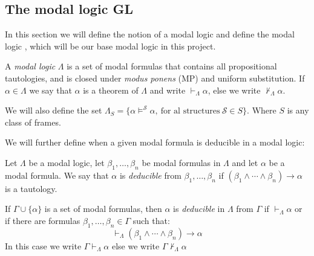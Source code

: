 \documentclass[../main.tex]{subfiles}
\begin{document}
\subsection{The modal logic GL}
In this section we will define the notion of a modal logic and define the modal
logic \GL, which will be our base modal logic in this project.
\begin{defi}
	A \textit{modal logic} $\Lambda$ is a set of modal formulas that contains all
	propositional tautologies, and is closed under \textit{modus ponens}
	(MP) and uniform substitution. If $\alpha\in\Lambda$ we say that
	$\alpha$ is a theorem of $\Lambda$ and write $\vdash_\Lambda\alpha$,
	else we write $\not\vdash_\Lambda\alpha$.

	We will also define the set
	$\Lambda_S=\{\alpha\vDash^\mathcal{S}\alpha,\ \text{for al structures}\
	\mathcal{S}\in S\}$. Where $S$ is any class of frames.
\end{defi}
We will further define when a given modal formula is deducible in a modal
logic:
\begin{defi}
	Let $\Lambda$ be a modal logic, let $\beta_1,\ldots,\beta_n$
	be modal formulas in $\Lambda$ and let $\alpha$ be a modal formula. We say that
	$\alpha$ is \textit{deducible} from $\beta_1,\ldots,\beta_n$ if
	$(\beta_1\wedge\cdots\wedge\beta_n)\rightarrow\alpha$ is a tautology.

	If $\Gamma\cup\{\alpha\}$ is a set of modal formulas, then $\alpha$ is
	\textit{deducible} in $\Lambda$ from $\Gamma$ if $\vdash_\Lambda\alpha$ or if
	there are formulas $\beta_1,\ldots,\beta_n\in\Gamma$ such that:
	\[\vdash_\Lambda(\beta_1\wedge\cdots\wedge\beta_n)\rightarrow\alpha\]
	In this case we write $\Gamma\vdash_\Lambda\alpha$ else we write
	$\Gamma\not\vdash_\Lambda\alpha$	
\end{defi}
\end{document}
